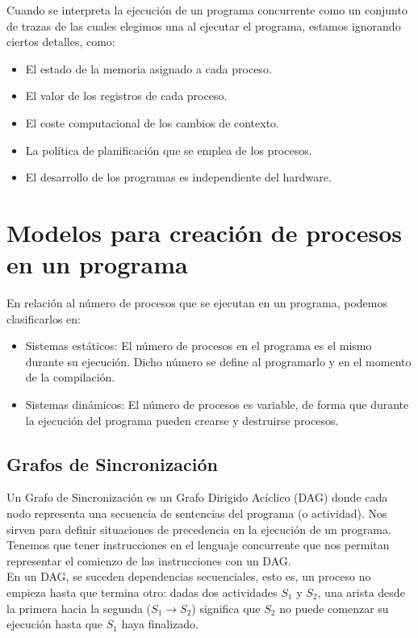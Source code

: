 \noindent
Cuando se interpreta la ejecución de un programa concurrente como un conjunto de trazas de las cuales elegimos una al ejecutar el programa, estamos ignorando ciertos detalles, como:
\begin{itemize}
    \item El estado de la memoria asignado a cada proceso.
    \item El valor de los registros de cada proceso.
    \item El coste computacional de los cambios de contexto.
    \item La política de planificación que se emplea de los procesos.
    \item El desarrollo de los programas es independiente del hardware.
\end{itemize}

\section{Modelos para creación de procesos en un programa}
En relación al número de procesos que se ejecutan en un programa, podemos clasificarlos en:
\begin{itemize}
    \item Sistemas estáticos: El número de procesos en el programa es el mismo durante su ejecución. Dicho número se define al programarlo y en el momento de la compilación.
    \item Sistemas dinámicos: El número de procesos es variable, de forma que durante la ejecución del programa pueden crearse y destruirse procesos.
\end{itemize}

\subsection{Grafos de Sincronización}
Un Grafo de Sincronización es un Grafo Dirigido Acíclico (DAG) donde cada nodo representa una secuencia de sentencias del programa (o actividad). Nos sirven para definir situaciones de precedencia en la ejecución de un programa. Tenemos que tener instrucciones en el lenguaje concurrente que nos permitan representar el comienzo de las instrucciones con un DAG\@.\\

En un DAG, se suceden dependencias secuenciales, esto es, un proceso no empieza hasta que termina otro: dadas dos actividades $S_1$ y $S_2$, una arista desde la primera hacia la segunda ($S_1\rightarrow S_2$) significa que $S_2$ no puede comenzar su ejecución hasta que $S_1$ haya finalizado.\\

